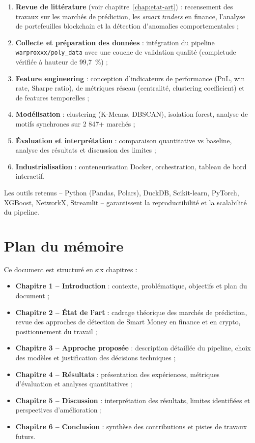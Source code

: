 \begin{enumerate}
  \item \textbf{Revue de littérature} (voir chapitre~\ref{chap:etat-art}) : recensement des travaux sur les marchés de prédiction, les \textit{smart traders} en finance, l'analyse de portefeuilles blockchain et la détection d'anomalies comportementales ;
  \item \textbf{Collecte et préparation des données} : intégration du pipeline \texttt{warproxxx/poly\_data} avec une couche de validation qualité (completude vérifiée à hauteur de 99,7~\%) ;
  \item \textbf{Feature engineering} : conception d'indicateurs de performance (PnL, win rate, Sharpe ratio), de métriques réseau (centralité, clustering coefficient) et de features temporelles ;
  \item \textbf{Modélisation} : clustering (K-Means, DBSCAN), isolation forest, analyse de motifs synchrones sur 2 847+ marchés ;
  \item \textbf{Évaluation et interprétation} : comparaison quantitative vs baseline, analyse des résultats et discussion des limites ;
  \item \textbf{Industrialisation} : conteneurisation Docker, orchestration, tableau de bord interactif.
\end{enumerate}

Les outils retenus -- Python (Pandas, Polars), DuckDB, Scikit-learn, PyTorch, XGBoost, NetworkX, Streamlit -- garantissent la reproductibilité et la scalabilité du pipeline.

\section{Plan du mémoire}

Ce document est structuré en six chapitres :

\begin{itemize}
  \item \textbf{Chapitre 1 -- Introduction} : contexte, problématique, objectifs et plan du document ;
  \item \textbf{Chapitre 2 -- État de l'art} : cadrage théorique des marchés de prédiction, revue des approches de détection de Smart Money en finance et en crypto, positionnement du travail ;
  \item \textbf{Chapitre 3 -- Approche proposée} : description détaillée du pipeline, choix des modèles et justification des décisions techniques ;
  \item \textbf{Chapitre 4 -- Résultats} : présentation des expériences, métriques d'évaluation et analyses quantitatives ;
  \item \textbf{Chapitre 5 -- Discussion} : interprétation des résultats, limites identifiées et perspectives d'amélioration ;
  \item \textbf{Chapitre 6 -- Conclusion} : synthèse des contributions et pistes de travaux futurs.
\end{itemize}

